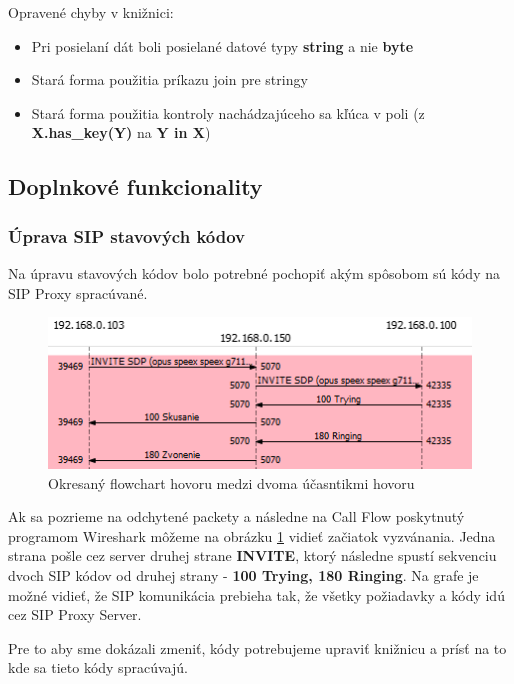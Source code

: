 \documentclass[10pt,oneside,slovak,a4paper]{article}
\begin{document}
Opravené chyby v knižnici:
\begin{itemize}
	\item Pri posielaní dát boli posielané datové typy \textbf{string} a nie \textbf{byte}
	\item Stará forma použitia príkazu join pre stringy
	\item Stará forma použitia kontroly nachádzajúceho sa kľúca v poli (z \textbf{X.has\_key(Y)} na \textbf{Y in X})
\end{itemize}

\subsection{Doplnkové funkcionality}
\subsubsection{Úprava SIP stavových kódov}
Na úpravu stavových kódov bolo potrebné pochopiť akým spôsobom sú kódy na SIP Proxy spracúvané.
\begin{figure}[H]
	\label{flow1}
	\centering
	\includegraphics[scale=1, width=\textwidth]{chart1.png}
	\caption{Okresaný flowchart hovoru medzi dvoma účasntikmi hovoru}
\end{figure}

Ak sa pozrieme na odchytené packety a následne na Call Flow poskytnutý programom Wireshark môžeme na obrázku \ref{flow1} vidieť začiatok vyzvánania. Jedna strana pošle cez server druhej strane \textbf{INVITE}, ktorý následne spustí sekvenciu dvoch SIP kódov od druhej strany - \textbf{100 Trying, 180 Ringing}. Na grafe je možné vidieť, že SIP komunikácia prebieha tak, že všetky požiadavky a kódy idú cez SIP Proxy Server.

Pre to aby sme dokázali zmeniť, kódy potrebujeme upraviť knižnicu a prísť na to kde sa tieto kódy spracúvajú.
\end{document}
